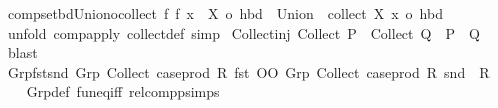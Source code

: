 \begin{isabellebody}
%
\isadelimproof
\isanewline
%
\endisadelimproof
\isanewline
{}\isamarkupfalse%
\ comp{\isacharunderscore}{\kern0pt}set{\isacharunderscore}{\kern0pt}bd{\isacharunderscore}{\kern0pt}Union{\isacharunderscore}{\kern0pt}o{\isacharunderscore}{\kern0pt}collect{\isacharcolon}{\kern0pt}\ {\isachardoublequoteopen}{\isacharbar}{\kern0pt}{\isasymUnion}{\isacharparenleft}{\kern0pt}{\isasymUnion}{\isacharparenleft}{\kern0pt}{\isacharparenleft}{\kern0pt}{\isasymlambda}f{\isachardot}{\kern0pt}\ f\ x{\isacharparenright}{\kern0pt}\ {\isacharbackquote}{\kern0pt}\ X{\isacharparenright}{\kern0pt}{\isacharparenright}{\kern0pt}{\isacharbar}{\kern0pt}\ {\isasymle}o\ hbd\ {\isasymLongrightarrow}\ {\isacharbar}{\kern0pt}{\isacharparenleft}{\kern0pt}Union\ {\isasymcirc}\ collect\ X{\isacharparenright}{\kern0pt}\ x{\isacharbar}{\kern0pt}\ {\isasymle}o\ hbd{\isachardoublequoteclose}\isanewline
%
\isadelimproof
\ \ %
\endisadelimproof
%
\isatagproof
{}\isamarkupfalse%
\ {\isacharparenleft}{\kern0pt}unfold\ comp{\isacharunderscore}{\kern0pt}apply\ collect{\isacharunderscore}{\kern0pt}def{\isacharparenright}{\kern0pt}\ simp%
\endisatagproof
{\isafoldproof}%
%
\isadelimproof
\isanewline
%
\endisadelimproof
\isanewline
{}\isamarkupfalse%
\ Collect{\isacharunderscore}{\kern0pt}inj{\isacharcolon}{\kern0pt}\ {\isachardoublequoteopen}Collect\ P\ {\isacharequal}{\kern0pt}\ Collect\ Q\ {\isasymLongrightarrow}\ P\ {\isacharequal}{\kern0pt}\ Q{\isachardoublequoteclose}\isanewline
%
\isadelimproof
\ \ %
\endisadelimproof
%
\isatagproof
{}\isamarkupfalse%
\ blast%
\endisatagproof
{\isafoldproof}%
%
\isadelimproof
\isanewline
%
\endisadelimproof
\isanewline
{}\isamarkupfalse%
\ Grp{\isacharunderscore}{\kern0pt}fst{\isacharunderscore}{\kern0pt}snd{\isacharcolon}{\kern0pt}\ {\isachardoublequoteopen}{\isacharparenleft}{\kern0pt}Grp\ {\isacharparenleft}{\kern0pt}Collect\ {\isacharparenleft}{\kern0pt}case{\isacharunderscore}{\kern0pt}prod\ R{\isacharparenright}{\kern0pt}{\isacharparenright}{\kern0pt}\ fst{\isacharparenright}{\kern0pt}{\isasyminverse}{\isasyminverse}\ OO\ Grp\ {\isacharparenleft}{\kern0pt}Collect\ {\isacharparenleft}{\kern0pt}case{\isacharunderscore}{\kern0pt}prod\ R{\isacharparenright}{\kern0pt}{\isacharparenright}{\kern0pt}\ snd\ {\isacharequal}{\kern0pt}\ R{\isachardoublequoteclose}\isanewline
%
\isadelimproof
\ \ %
\endisadelimproof
%
\isatagproof
{}\isamarkupfalse%
\ Grp{\isacharunderscore}{\kern0pt}def\ fun{\isacharunderscore}{\kern0pt}eq{\isacharunderscore}{\kern0pt}iff\ relcompp{\isachardot}{\kern0pt}simps\ \isamarkupfalse%

\end{isabellebody}
